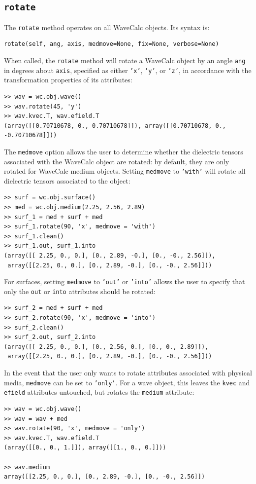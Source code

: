 \documentclass[11pt, reqno]{book}%
\newcounter{ct}
\newcommand{\tw}[1]{{\tt #1}}
\begin{document}
\subsection{\tw{rotate}}
\label{sec:rotatemethod}

The \tw{rotate} method operates on all WaveCalc objects. Its syntax is:
\begin{verbatim}
rotate(self, ang, axis, medmove=None, fix=None, verbose=None)
\end{verbatim}
\noindent When called, the \tw{rotate} method will rotate a WaveCalc object by an angle \tw{ang} in degrees about \tw{axis}, specified as either \tw{'x'}, \tw{'y'}, or \tw{'z'}, in accordance with the transformation properties of its attributes:
\begin{verbatim}
>> wav = wc.obj.wave()
>> wav.rotate(45, 'y')
>> wav.kvec.T, wav.efield.T
(array([[0.70710678, 0., 0.70710678]]), array([[0.70710678, 0., -0.70710678]]))
\end{verbatim} 
\noindent The \tw{medmove} option allows the user to determine whether the dielectric tensors associated with the WaveCalc object are rotated: by default, they are only rotated for WaveCalc medium objects. Setting \tw{medmove} to \tw{'with'} will rotate all dielectric tensors associated to the object:
\begin{verbatim}
>> surf = wc.obj.surface()
>> med = wc.obj.medium(2.25, 2.56, 2.89)
>> surf_1 = med + surf + med
>> surf_1.rotate(90, 'x', medmove = 'with')
>> surf_1.clean()
>> surf_1.out, surf_1.into
(array([[ 2.25, 0., 0.], [0., 2.89, -0.], [0., -0., 2.56]]), 
 array([[2.25, 0., 0.], [0., 2.89, -0.], [0., -0., 2.56]]))
\end{verbatim} 
\noindent For surfaces, setting \tw{medmove} to \tw{'out'} or \tw{'into'} allows the user to specify that only the \tw{out} or \tw{into} attributes should be rotated:
\begin{verbatim}
>> surf_2 = med + surf + med
>> surf_2.rotate(90, 'x', medmove = 'into')
>> surf_2.clean()
>> surf_2.out, surf_2.into
(array([[ 2.25, 0., 0.], [0., 2.56, 0.], [0., 0., 2.89]]), 
 array([[2.25, 0., 0.], [0., 2.89, -0.], [0., -0., 2.56]]))
\end{verbatim}
\noindent In the event that the user only wants to rotate attributes associated with physical media, \tw{medmove} can be set to \tw{'only'}. For a wave object, this leaves the \tw{kvec} and \tw{efield} attributes untouched, but rotates the \tw{medium} attribute: 
\begin{verbatim}
>> wav = wc.obj.wave()
>> wav = wav + med
>> wav.rotate(90, 'x', medmove = 'only')
>> wav.kvec.T, wav.efield.T
(array([[0., 0., 1.]]), array([[1., 0., 0.]]))

>> wav.medium
array([[2.25, 0., 0.], [0., 2.89, -0.], [0., -0., 2.56]])
\end{verbatim}
\end{document}
